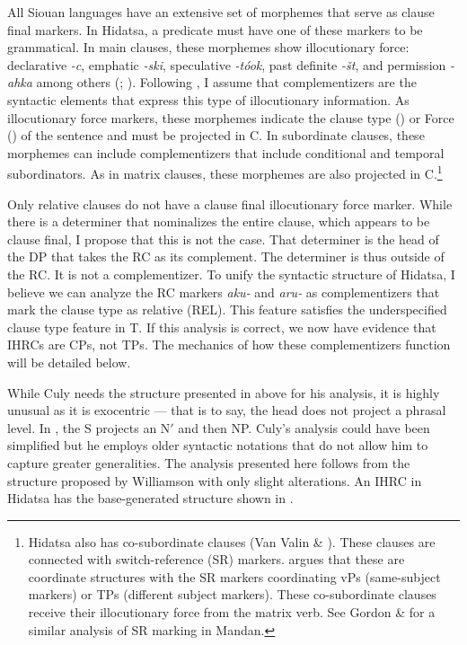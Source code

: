 \documentclass[output=paper]{LSP/langsci}
\begin{document}
	All Siouan languages have an extensive set of morphemes that serve as clause final markers. In Hidatsa, a predicate must have one of these markers to be grammatical. In main clauses, these morphemes show illocutionary force: declarative \textit{-c}, emphatic \textit{-ski}, speculative \textit{-t\'ook}, past definite \textit{-\v{s}t}, and permission \textit{-ahka} among others (\citealt{Matthews1965}; \citealt{Boyle2007}). Following \citet{Rizzi1997}, I assume that complementizers are the syntactic elements that express this type of illocutionary information. As illocutionary force markers, these morphemes indicate the clause type (\citealt{Cheng1997}) or Force (\citealt{Chomsky1995}) of the sentence and must be projected in C. In subordinate clauses, these morphemes can include complementizers that include conditional and temporal subordinators. As in matrix clauses, these morphemes are also projected in C.\footnote{Hidatsa also has co-subordinate clauses (Van Valin \& \citealt{LaPolla1997}). These clauses are connected with switch-reference (SR) markers. \citet{Boyle2007} argues that these are coordinate structures with the SR markers coordinating vPs (same-subject markers) or TPs (different subject markers). These co-subordinate clauses receive their illocutionary force from the matrix verb. See Gordon \& \citet{Torres2012} for a similar analysis of SR marking in Mandan.}
	
Only relative clauses do not have a clause final illocutionary force marker.  While there is a determiner that nominalizes the entire clause, which appears to be clause final, I propose that this is not the case. That determiner is the head of the DP that takes the RC as its complement. The determiner is thus outside of the RC. It is not a complementizer. To unify the syntactic structure of Hidatsa, I believe we can analyze the RC markers \textit{aku-} and \textit{aru-} as complementizers that mark the clause type as relative (REL). This feature satisfies the underspecified clause type feature in T. If this analysis is correct, we now have evidence that IHRCs are CPs, not TPs. The mechanics of how these complementizers function will be detailed below.   
	
While Culy needs the structure presented in  above for his analysis, it is highly unusual as it is exocentric --- that is to say, the head does not project a phrasal level. In , the S projects an N$'$ and then NP. Culy's analysis could have been simplified but he employs older syntactic notations that do not allow him to capture greater generalities. The analysis presented here follows from the structure proposed by Williamson with only slight alterations. An IHRC in Hidatsa has the base-generated structure shown in . 
\end{document}
